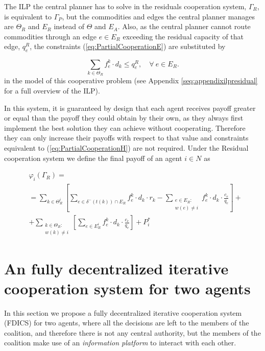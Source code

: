 \documentclass{article}
\begin{document}
The ILP the central planner has to solve in the residuals cooperation system, $\Gamma_R$, is equivalent to $\Gamma_P$, but the commodities and edges the central planner manages are $\Theta_R$ and $E_R$ instead of $\Theta$ and $E_A$. Also, as the central planner cannot route commodities through an edge $e\in E_R$ exceeding the residual capacity of that edge, $q_e^R$, the constraints (\ref{eq:PartialCooperationE}) are substituted by

\begin{equation}
\sum_{k \in \Theta_R} f_e^k\cdot d_k \leq q_e^R,\quad \forall\ e \in E_R.
\end{equation}
in the model of this cooperative problem (see Appendix \ref{seq:appendixilpresidual} for a full overview of the ILP).
    
In this system, it is guaranteed by design that each agent receives  payoff greater or equal than the payoff they could obtain by their own, as they always first implement the best solution they can achieve without cooperating. Therefore they can only increase their payoffs with respect to that value and constraints equivalent to (\ref{eq:PartialCooperationH}) are not required. Under the Residual cooperation system we define the final payoff of an agent $i\in N$ as

\begin{equation}
    \begin{split}
    & \varphi_i(\Gamma_R) =\label{eq:ResidualCooperationPayoff} \\
    & = \sum_{k\in \Theta^i_R} \left[ \sum_{e \in \delta^-(t(k))\cap E_R} f_e^k \cdot d_k \cdot r_k -  \sum_{\substack{e\in E_R \colon\\ w(e)\not = i}} f_e^k \cdot d_k \cdot \frac{c_e}{q_e} \right] + \\
    & + \sum_{\substack{k \in \Theta_R  \colon \\ w(k) \not = i}} \left[\sum_{e \in E_R^i} f_e^k \cdot d_k \cdot \frac{c_e}{q_e}\right] + P_i^*
    \end{split}
\end{equation}


\section{An fully decentralized iterative cooperation system for two agents} \label{seq:itermodel}

In this section we propose a fully decentralized iterative cooperation system (FDICS) for two agents, where all the decisions are left to the members of the coalition, and therefore there is not any central authority, but the members of the coalition make use of an \emph{information platform} to interact with each other.
\end{document}
